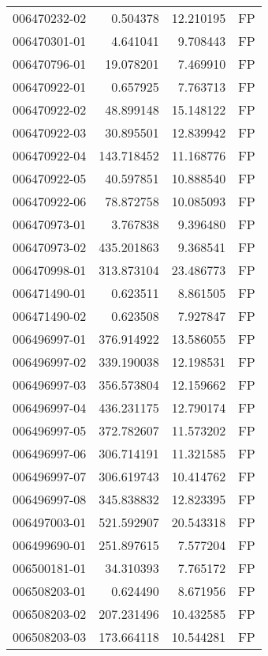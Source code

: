 \begin{tabular}{lrrl}
006470232-02 &    0.504378 &      12.210195 &   FP \\
006470301-01 &    4.641041 &       9.708443 &   FP \\
006470796-01 &   19.078201 &       7.469910 &   FP \\
006470922-01 &    0.657925 &       7.763713 &   FP \\
006470922-02 &   48.899148 &      15.148122 &   FP \\
006470922-03 &   30.895501 &      12.839942 &   FP \\
006470922-04 &  143.718452 &      11.168776 &   FP \\
006470922-05 &   40.597851 &      10.888540 &   FP \\
006470922-06 &   78.872758 &      10.085093 &   FP \\
006470973-01 &    3.767838 &       9.396480 &   FP \\
006470973-02 &  435.201863 &       9.368541 &   FP \\
006470998-01 &  313.873104 &      23.486773 &   FP \\
006471490-01 &    0.623511 &       8.861505 &   FP \\
006471490-02 &    0.623508 &       7.927847 &   FP \\
006496997-01 &  376.914922 &      13.586055 &   FP \\
006496997-02 &  339.190038 &      12.198531 &   FP \\
006496997-03 &  356.573804 &      12.159662 &   FP \\
006496997-04 &  436.231175 &      12.790174 &   FP \\
006496997-05 &  372.782607 &      11.573202 &   FP \\
006496997-06 &  306.714191 &      11.321585 &   FP \\
006496997-07 &  306.619743 &      10.414762 &   FP \\
006496997-08 &  345.838832 &      12.823395 &   FP \\
006497003-01 &  521.592907 &      20.543318 &   FP \\
006499690-01 &  251.897615 &       7.577204 &   FP \\
006500181-01 &   34.310393 &       7.765172 &   FP \\
006508203-01 &    0.624490 &       8.671956 &   FP \\
006508203-02 &  207.231496 &      10.432585 &   FP \\
006508203-03 &  173.664118 &      10.544281 &   FP \\

\end{tabular}
